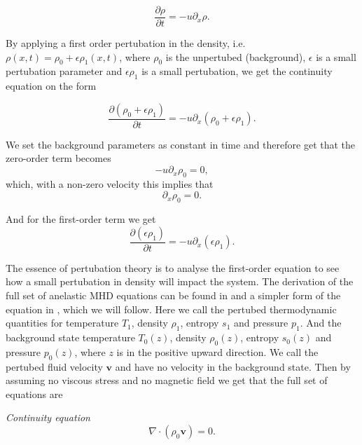 \documentclass{article}
\begin{document}
\begin{equation*}
    \frac{\partial\rho}{\partial t} = -u\partial_x\rho.
\end{equation*}

By applying a first order pertubation in the density, i.e. $\rho(x,t)=\rho_0 + \epsilon\rho_1(x,t)$, where $\rho_0$ is the unpertubed (background), $\epsilon$ is a small pertubation parameter and $\epsilon\rho_1$ is a small pertubation, we get the continuity equation on the form

\begin{equation*}
    \frac{\partial(\rho_0+\epsilon\rho_1)}{\partial t} = -u\partial_x(\rho_0+\epsilon\rho_1).
\end{equation*}

We set the background parameters as constant in time and therefore get that the zero-order term becomes
\begin{equation*}
    -u\partial_x\rho_0 = 0,
\end{equation*}
which, with a non-zero velocity this implies that
\begin{equation*}
    \partial_x\rho_0 = 0.
\end{equation*}

And for the first-order term we get
\begin{equation*}
    \frac{\partial(\epsilon\rho_1)}{\partial t} = -u\partial_x(\epsilon\rho_1).
\end{equation*}

The essence of pertubation theory is to analyse the first-order equation to see how a small pertubation in density will impact the system. The derivation of the full set of anelastic MHD equations can be found in \citep{1999ApJS..121..247L} and a simpler form of the equation in \citep{2021LRSP...18....5F}, which we will follow. Here we call the pertubed thermodynamic quantities for temperature $T_1$, density $\rho_1$, entropy $s_1$ and pressure $p_1$. And the background state temperature $T_0(z)$, density $\rho_0(z)$, entropy $s_0(z)$ and pressure $p_0(z)$, where $z$ is in the positive upward direction. We call the pertubed fluid velocity $\mathbf{v}$ and have no velocity in the background state. Then by assuming no viscous stress and no magnetic field we get that the full set of equations are

\textit{Continuity equation}
\begin{equation}\label{eq:continuity_full}
    \nabla\cdot(\rho_0\mathbf{v})=0.
\end{equation}
\end{document}
